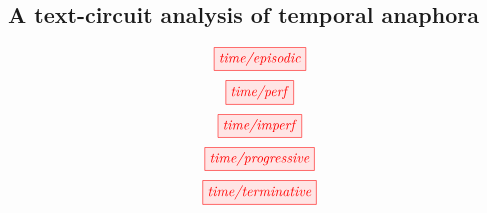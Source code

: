 \subsection{A text-circuit analysis of temporal anaphora}

\begin{defn}

\end{defn}

\[\tikzfig{time/episodic}\]
\[\tikzfig{time/perf}\]
\[\tikzfig{time/imperf}\]
\[\tikzfig{time/progressive}\]
\[\tikzfig{time/terminative}\]
